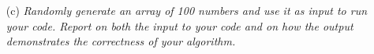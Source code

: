 \documentclass[12pt]{article}
\begin{document}
{\begin{enumerate}
\item[(c)]\textsl{Randomly generate an array of 100 numbers and use it as input to run your code. Report on both the input to your code and on how the output demonstrates the correctness of your algorithm.}\\ \\
    
\end{enumerate}

}
\end{document}
